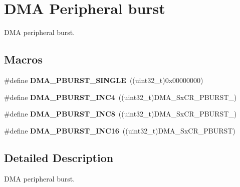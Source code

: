 \hypertarget{group___d_m_a___peripheral__burst}{}\section{D\+MA Peripheral burst}
\label{group___d_m_a___peripheral__burst}


D\+MA peripheral burst.  


\subsection*{Macros}
\begin{DoxyCompactItemize}
\item 
\#define {\bfseries D\+M\+A\+\_\+\+P\+B\+U\+R\+S\+T\+\_\+\+S\+I\+N\+G\+LE}~((uint32\+\_\+t)0x00000000)\hypertarget{group___d_m_a___peripheral__burst_ga1ee9cf4dc1c8bfc5ab6dfb95a00f81ff}{}\label{group___d_m_a___peripheral__burst_ga1ee9cf4dc1c8bfc5ab6dfb95a00f81ff}

\item 
\#define {\bfseries D\+M\+A\+\_\+\+P\+B\+U\+R\+S\+T\+\_\+\+I\+N\+C4}~((uint32\+\_\+t)D\+M\+A\+\_\+\+Sx\+C\+R\+\_\+\+P\+B\+U\+R\+S\+T\+\_)\hypertarget{group___d_m_a___peripheral__burst_gacc54efc746528ed9e0173dad956f7caf}{}\label{group___d_m_a___peripheral__burst_gacc54efc746528ed9e0173dad956f7caf}

\item 
\#define {\bfseries D\+M\+A\+\_\+\+P\+B\+U\+R\+S\+T\+\_\+\+I\+N\+C8}~((uint32\+\_\+t)D\+M\+A\+\_\+\+Sx\+C\+R\+\_\+\+P\+B\+U\+R\+S\+T\+\_)\hypertarget{group___d_m_a___peripheral__burst_gaf76dd9b208c8606e8c5ae7abf8c26532}{}\label{group___d_m_a___peripheral__burst_gaf76dd9b208c8606e8c5ae7abf8c26532}

\item 
\#define {\bfseries D\+M\+A\+\_\+\+P\+B\+U\+R\+S\+T\+\_\+\+I\+N\+C16}~((uint32\+\_\+t)D\+M\+A\+\_\+\+Sx\+C\+R\+\_\+\+P\+B\+U\+R\+ST)\hypertarget{group___d_m_a___peripheral__burst_ga705a631ea96b34aa5afa7fed06a487e0}{}\label{group___d_m_a___peripheral__burst_ga705a631ea96b34aa5afa7fed06a487e0}

\end{DoxyCompactItemize}


\subsection{Detailed Description}
D\+MA peripheral burst. 

